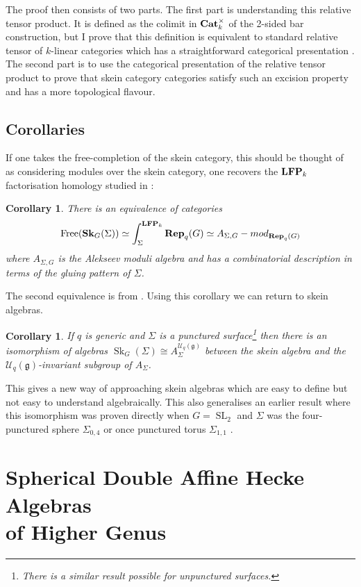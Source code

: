 \documentclass{article}
\newcommand{\catname}[1]{{\normalfont\textbf{#1}}}
\newcommand{\Cat}{\catname{Cat}}
\newcommand{\LFP}{\catname{LFP}}
\newcommand{\SK}{\catname{Sk}}
\newcommand{\Rep}{\catname{Rep}}
\newcommand{\Sk}{\operatorname{Sk}}
\newcommand{\Free}{\operatorname{Free}}
\newcommand{\SL}{\operatorname{SL}}
\newtheorem{cor}[thm]{Corollary}
\begin{document}
The proof then consists of two parts. The first part is understanding this relative tensor product. It is defined as the colimit in $\Cat_k^{\times}$ of the 2-sided bar construction, but I prove that this definition is equivalent to standard relative tensor of $k$-linear categories which has a straightforward categorical presentation \cite{Tambara01}. The second part is to use the categorical presentation of the relative tensor product to prove that skein category categories satisfy such an excision property and has a more topological flavour. 

\subsection{Corollaries}

If one takes the free-completion of the skein category, this should be thought of as considering modules over the skein category, one recovers the $\LFP_k$ factorisation homology studied in \cite{david1}:

\begin{cor}
There is an equivalence of categories 
\[
\Free(\SK_G(\Sigma)) \simeq \int_{\Sigma}^{\LFP_k} \Rep_q(G) \simeq A_{\Sigma, G}-mod_{\Rep_q(G)}
\]
where $A_{\Sigma, G}$ is the Alekseev moduli algebra and has a combinatorial description in terms of the gluing pattern of $\Sigma$.
\end{cor}

The second equivalence is from \cite{david1}. Using this corollary we can return to skein algebras.

\begin{cor}
If $q$ is generic and $\Sigma$ is a punctured surface\footnote{There is a similar result possible for unpunctured surfaces.} then there is an isomorphism of algebras $\Sk_G(\Sigma) \cong A_{\Sigma}^{\mathcal{U}_q(\mathfrak{g})}$ between the skein algebra and the $\mathcal{U}_q(\mathfrak{g})$-invariant subgroup of $A_{\Sigma}$.  
\end{cor}

This gives a new way of approaching skein algebras which are easy to define but not easy to understand algebraically.
This also generalises an earlier result where this isomorphism was proven directly when $G=\SL_2$ and $\Sigma$ was the four-punctured sphere $\Sigma_{0,4}$ or once punctured torus $\Sigma_{1,1}$ \cite{C1}. 

\section{Spherical Double Affine Hecke Algebras \\ of Higher Genus}
\end{document}
